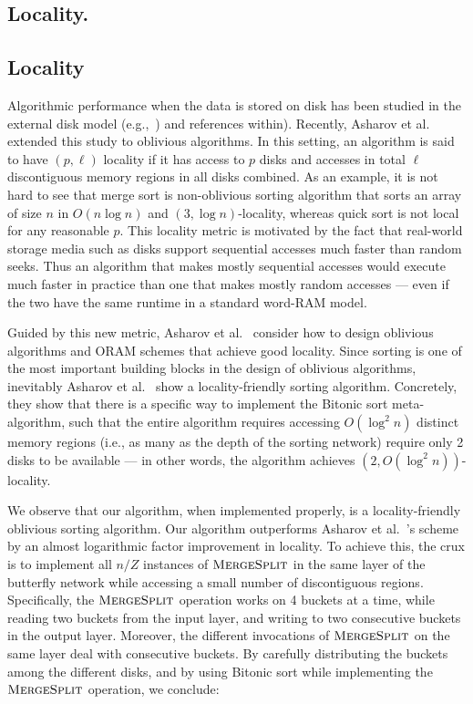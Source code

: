 \subsection{Locality.}
\subsection{Locality}
Algorithmic performance when the data is stored on disk has been studied in the external disk model (e.g.,~\cite{RuemmlerW94,ArgeFGV97,Vitter01,Vitter06}) and references within). Recently, Asharov et al.~\cite{AsharovCNPRS19} extended this study to oblivious algorithms. In this setting, an algorithm 
is said to have $(p, \ell)$ locality if it has access 
to $p$ disks and 
accesses in total $\ell$ discontiguous memory regions in all disks combined. As an example, it is not hard to see that merge sort is non-oblivious sorting algorithm that sorts an array of size $n$ in $O(n \log n)$ and $(3,\log n)$-locality, whereas quick sort  is not local for any reasonable $p$. 
This locality metric is motivated by the fact that real-world storage
media such as disks support sequential accesses
much faster than random seeks. Thus an algorithm that 
makes mostly sequential accesses would execute much faster in practice than one that  
makes mostly random accesses --- even if the two have the same runtime in a standard
word-RAM model. 

Guided by this new metric, Asharov et al.~\cite{AsharovCNPRS19} consider how to design oblivious algorithms and ORAM schemes that achieve good locality. 
Since sorting is one of the most important
building blocks in the 
design of oblivious algorithms, 
inevitably Asharov et al.~\cite{AsharovCNPRS19}
show a locality-friendly sorting algorithm.
Concretely, they show that there is a specific way to implement
the Bitonic sort meta-algorithm,
such that the entire algorithm requires accessing 
$O(\log^2 n)$ distinct memory regions (i.e., as many as the depth of the sorting network) 
require only 2 disks to be available --- in other words,
the algorithm achieves $(2, O(\log^2 n))$-locality.

We observe that our algorithm, when implemented properly, is a locality-friendly oblivious sorting algorithm. 
Our algorithm 
outperforms Asharov et al.~\cite{AsharovCNPRS19}'s  scheme 
by an almost logarithmic 
factor improvement in locality. %
To achieve this, the crux is to implement all $n/Z$ instances of 
$\textsc{MergeSplit}$ in the same layer of the butterfly network 
while accessing a small number of discontiguous regions. Specifically, the $\textsc{MergeSplit}$ operation works on 4 buckets at a time, while reading two buckets from the input layer, and writing to two consecutive buckets in the output layer. Moreover, the different invocations of $\textsc{MergeSplit}$ on the same layer deal with consecutive buckets. By carefully distributing the buckets among the different disks, and by using Bitonic sort while implementing the $\textsc{MergeSplit}$ operation, we conclude:

